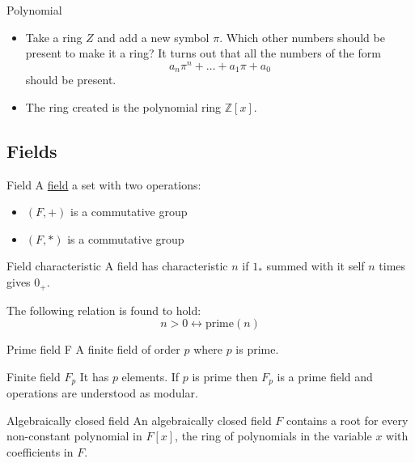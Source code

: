\documentclass[presentation]{beamer}
\begin{document}
\begin{frame}[label={sec:org9d2c62d}]{Polynomial}
\begin{itemize}
\item Take a ring \(Z\) and add a new symbol \(\pi\). Which other numbers should be
present to make it a ring? It turns out that all the numbers of the form
$$a_n \pi^n + \dots + a_1 \pi + a_0$$ should be present.
\item The ring created is the polynomial ring \(\mathbb{Z}[x]\).
\end{itemize}
\end{frame}
\subsection{Fields}
\label{sec:org550be7a}

\begin{frame}[label={sec:orgaf0b771}]{Field}
A \href{https://en.wikipedia.org/wiki/Field\_(mathematics)}{field} a set with two operations:

\begin{itemize}
\item \((F, +)\) is a commutative group
\item \((F, *)\) is a commutative group
\end{itemize}
\end{frame}

\begin{frame}[label={sec:org90b3db0}]{Field characteristic}
A field has characteristic \(n\) if \(1_{*}\) summed with it self \(n\) times gives
\(0_{+}\).

The following relation is found to hold: $$ n > 0 \leftrightarrow
    \textrm{prime}(n)$$
\end{frame}

\begin{frame}[label={sec:org8b02cfd}]{Prime field F}
A finite field of order \(p\) where \(p\) is prime.
\end{frame}

\begin{frame}[label={sec:org4ab092a}]{Finite field \(F_p\)}
It has \(p\) elements. If \(p\) is prime then \(F_p\) is a prime field and
operations are understood as modular.
\end{frame}

\begin{frame}[label={sec:orgc47181d}]{Algebraically closed field}
An algebraically closed field \(F\) contains a root for every non-constant
polynomial in \(F[x]\), the ring of polynomials in the variable \(x\) with
coefficients in \(F\).
\end{frame}
\end{document}
